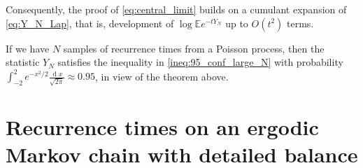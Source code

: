 \documentclass[10pt,journal,compsoc]{IEEEtran}
\DeclareMathOperator{\D}{d}
\begin{document}
\begin{IEEEproof}

Consequently, the proof of \eqref{eq:central_limit} builds on a cumulant expansion of  \eqref{eq:Y_N_Lap}, that is, development of $ \log
\mathbb E e^{-t Y_N}$ up to $ O(t^2)$ terms.\end{IEEEproof}

If we have $N$ samples of recurrence times from a Poisson process, then the statistic $Y_N$ satisfies the inequality in  \eqref{ineq:95_conf_large_N}  with probability $ \int_{-2}^2e^{-{x^2}/{2}}\frac{\D x}{\sqrt{2\pi}}\approx0.95$, in view of the theorem above.


\section{Recurrence times on an ergodic Markov chain with detailed balance}
\end{document}
